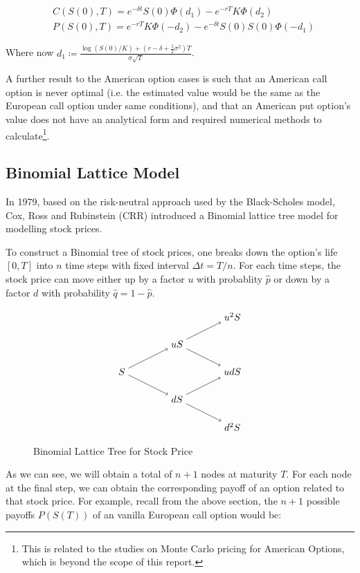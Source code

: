\begin{align}
	&C(S(0), T) = e^{-\delta t}S(0)\Phi(d_1) - e^{-rT}K\Phi(d_2) \\
	&P(S(0), T) = e^{-rT}K\Phi(-d_2) - e^{-\delta t}S(0)S(0)\Phi(-d_1)
\end{align}

Where now $d_1 \coloneqq \frac{\log(S(0)/K)+(r-\delta+\frac{1}{2}\sigma^2)T}{\sigma\sqrt{T}}$.

A further result to the American option cases is such that an American call option is never optimal (i.e. the estimated value would be the same as the European call option under same conditions), and that an American put option's value does not have an analytical form and required numerical methods to calculate\footnote{This is related to the studies on Monte Carlo pricing for American Options, which is beyond the scope of this report.}.

\subsection{Binomial Lattice Model}

In 1979, based on the risk-neutral approach used by the Black-Scholes model, Cox, Ross and Rubinstein (CRR) \cite{CRR1979} introduced a Binomial lattice tree model for modelling stock prices.

To construct a Binomial tree of stock prices, one breaks down the option's life $[0,T]$ into $n$ time steps with fixed interval $\Delta t=T/n$. For each time steps, the stock price can move either up by a factor $u$ with probablity $\hat{p}$ or down by a factor $d$ with probability $\hat{q}=1-\hat{p}$.


\begin{figure}[ht]
    \centering
    \[\tikz{
        \node (a) at (0, 2) {$S$};
        \node (b) at (2, 3) {$uS$};
        \node (c) at (2, 1) {$dS$};
		\node (d) at (4, 4) {$u^2S$};
        \node (e) at (4, 2) {$udS$};
		\node (f) at (4, 0) {$d^2S$};
        \path[->] (a) edge (b);
        \path[->] (a) edge (c);
		\path[->] (b) edge (d);
        \path[->] (b) edge (e);
		\path[->] (c) edge (e);
        \path[->] (c) edge (f);
    }\]
    \caption{Binomial Lattice Tree for Stock Price}
\end{figure}

As we can see, we will obtain a total of $n+1$ nodes at maturity $T$. For each node at the final step, we can obtain the corresponding payoff of an option related to that stock price. For example, recall from the above section, the $n+1$ possible payoffs $P(S(T))$ of an vanilla European call option would be:

